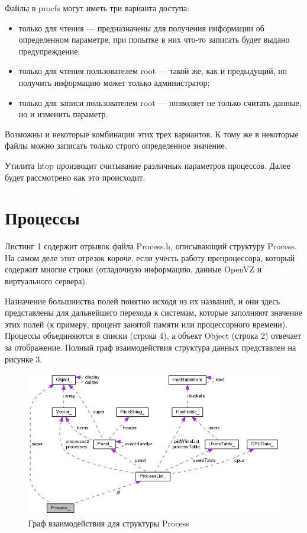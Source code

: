 \documentclass[a4paper, 12pt]{article}		%
\begin{document}
Файлы в  procfs могут иметь три варианта доступа:
\begin{itemize}
\item только для чтения — предназначены для получения информации об определенном параметре, при попытке в них что-то записать будет выдано предупреждение;
\item только для чтения пользователем root — такой же, как и предыдущий, но получить информацию может только администратор;
\item только для записи  пользователем root — позволяет не только считать данные, но и  изменить параметр.
\end{itemize}

Возможны и  некоторые комбинации  этих трех вариантов.  К тому же в  некоторые файлы можно записать только строго определенное значение.

Утилита htop производит считывание различных параметров процессов. Далее будет рассмотрено как это происходит.


\newpage
\section{Процессы}

Листинг 1 содержит отрывок файла Process.h, описывающий структуру Process. На самом деле этот отрезок короче, если учесть работу препроцессора, который содержит многие строки (отладочную информацию, данные OpenVZ и виртуального сервера).



Назначение большинства полей понятно исходя из их названий, и они здесь представлены для дальнейшего перехода к системам, которые заполняют значение этих полей (к примеру, процент занятой памяти или процессорного времени). Процессы объединяются в списки (строка 4), а объект Object (строка 2) отвечает за отображение. Полный граф взаимодействия структура данных представлен на рисунке 3.

\begin{figure}[h!]
\centering
\includegraphics[scale=0.7]{res/process.png}
\caption{Граф взаимодействия для структуры Process}
\end{figure}
\end{document}

